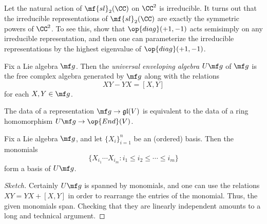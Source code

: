\documentclass{article}
\begin{document}
\begin{example}
	Let the natural action of $\mf{sl}_2(\CC)$ on $\CC^2$ is irreducible. It turns out that the irreducible representations of $\mf{sl}_2(\CC)$ are exactly the symmetric powers of $\CC^2$. To see this, show that $\op{diag}(+1,-1)$ acts semisimply on any irreducible representation, and then one can parameterize the irreducible representations by the highest eigenvalue of $\op{diag}(+1,-1)$.
\end{example}
\begin{definition}
	Fix a Lie algebra $\mf g$. Then the \textit{universal enveloping algebra} $U\mf g$ of $\mf g$ is the free complex algebra generated by $\mf g$ along with the relations
	\[XY-YX=[X,Y]\]
	for each $X,Y\in\mf g$.
\end{definition}
\begin{remark}
	The data of a representation $\mf g\to\mathfrak{gl}(V)$ is equivalent to the data of a ring homomorphism $U\mf g\to\op{End}(V)$.
\end{remark}
\begin{theorem} \label{thm:pbw}
	Fix a Lie algebra $\mf g$, and let $\{X_i\}_{i=1}^n$ be an (ordered) basis. Then the monomials
	\[\{X_{i_1}\cdots X_{i_m}:i_1\le i_2\le\cdots\le i_m\}\]
	form a basis of $U\mf g$.
\end{theorem}
\begin{proof}[Sketch]
	Certainly $U\mf g$ is spanned by monomials, and one can use the relations $XY=YX+[X,Y]$ in order to rearrange the entries of the monomial. Thus, the given monomials span. Checking that they are linearly independent amounts to a long and technical argument.
\end{proof}
\end{document}
